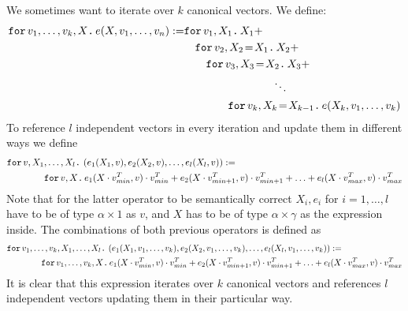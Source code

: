 We sometimes want to iterate over $k$ canonical vectors. We define:
\begin{align*}
  \ffor{v_1,\ldots, v_k}{X}{e(X,v_1,\ldots, v_n)}:= &\ffor{v_1}{X_1}{X_1 +} \\
  &\hspace{1em}\initf{X_1}{v_2}{X_2}{X_2 + } \\
  &\hspace{2em}\initf{X_2}{v_3}{X_3}{X_3 + } \\
  &\hspace{8em}\ddots \\
  &\hspace{4em}\initf{X_{k-1}}{v_k}{X_k}{ e(X_k,v_1,\ldots, v_k)}
\end{align*}
To reference $l$ independent vectors in every iteration and update them in different ways we define
\begin{align*}
&\ffor{v}{X_1,\ldots, X_l}{\left( e_1(X_1,v), e_2(X_2,v), \ldots, e_l(X_l,v) \right)} :=\\
&\hspace{4em}\ffor{v}{X}{e_1(X\cdot v_{min}^T,v)\cdot v_{min}^T + e_2(X\cdot v_{min+1}^T,v)\cdot v_{min+1}^T + \ldots + e_l(X\cdot v_{max}^T,v)\cdot v_{max}^T}
\end{align*}
Note that for the latter operator to be semantically correct $X_i,e_i$ for $ i=1,\ldots,l$ have to be of type $\alpha\times 1$ as $v$, and $X$ has to be of type $\alpha\times\gamma$ as the expression inside.
The combinations of both previous operators is defined as
\begin{align*}
&\ffor{v_1,\ldots, v_k}{X_1,\ldots, X_l}{\left( e_1(X_1,v_1,\ldots, v_k), e_2(X_2,v_1,\ldots, v_k), \ldots, e_l(X_l,v_1,\ldots, v_k) \right)} :=\\
&\hspace{4em}\ffor{v_1,\ldots, v_k}{X}{e_1(X\cdot v_{min}^T,v)\cdot v_{min}^T + e_2(X\cdot v_{min+1}^T,v)\cdot v_{min+1}^T + \ldots + e_l(X\cdot v_{max}^T,v)\cdot v_{max}^T}
\end{align*}
It is clear that this expression iterates over $k$ canonical vectors and references $l$ independent vectors updating them in their particular way.